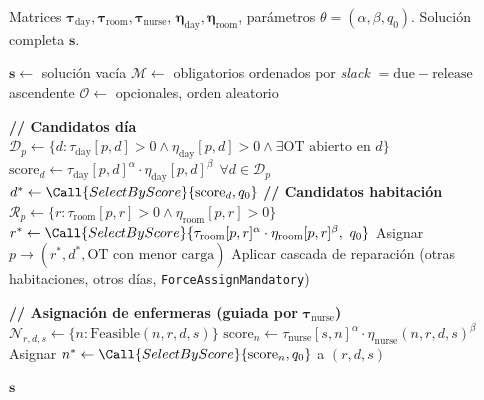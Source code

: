 \begin{algorithm}[H]
\caption{\textsc{ConstructSolution} — Construcción guiada por $\boldsymbol{\tau}$ y $\boldsymbol{\eta}$ (regla ACS).}
\label{alg:construct}
\begin{algorithmic}[1]
\Require Matrices $\boldsymbol{\tau}_{\text{day}}, \boldsymbol{\tau}_{\text{room}}, \boldsymbol{\tau}_{\text{nurse}}$, $\boldsymbol{\eta}_{\text{day}}, \boldsymbol{\eta}_{\text{room}}$, parámetros $\theta = (\alpha, \beta, q_0)$.
\Ensure Solución completa $\mathbf{s}$.

\State $\mathbf{s} \gets$ solución vacía
\State $\mathcal{M} \gets$ obligatorios ordenados por \textit{slack} $= \text{due} - \text{release}$ ascendente
\State $\mathcal{O} \gets$ opcionales, orden aleatorio

   \State \textbf{// Candidatos día}
   \State $\mathcal{D}_p \gets \{ d : \tau_{\text{day}}[p,d] > 0 \wedge \eta_{\text{day}}[p,d] > 0 \wedge \exists \text{OT abierto en } d\}$
   \State $\mathrm{score}_d \gets \tau_{\text{day}}[p,d]^{\alpha} \cdot \eta_{\text{day}}[p,d]^{\beta}\ \ \forall d \in \mathcal{D}_p$
   \State $d^{\ast} \gets \Call{SelectByScore}{\mathrm{score}_d, q_0}$
   \State \textbf{// Candidatos habitación}
   \State $\mathcal{R}_p \gets \{ r : \tau_{\text{room}}[p,r] > 0 \wedge \eta_{\text{room}}[p,r] > 0\}$
   \State $r^{\ast} \gets \Call{SelectByScore}{\tau_{\text{room}}[p,r]^{\alpha} \cdot \eta_{\text{room}}[p,r]^{\beta},\ q_0}$
   \State Asignar $p \to (r^{\ast}, d^{\ast}, \text{OT con menor carga})$
      \State Aplicar cascada de reparación (otras habitaciones, otros días, \texttt{ForceAssignMandatory})
   \EndIf
\EndFor

\State \textbf{// Asignación de enfermeras (guiada por } $\boldsymbol{\tau}_{\text{nurse}}$\textbf{)}
   \State $\mathcal{N}_{r,d,s} \gets \{n : \text{Feasible}(n, r, d, s)\}$
   \State $\mathrm{score}_n \gets \tau_{\text{nurse}}[s, n]^{\alpha} \cdot \eta_{\text{nurse}}(n, r, d, s)^{\beta}$
   \State Asignar $n^{\ast} \gets \Call{SelectByScore}{\mathrm{score}_n, q_0}$ a $(r, d, s)$
\EndFor

\State \Return $\mathbf{s}$
\end{algorithmic}
\end{algorithm}



